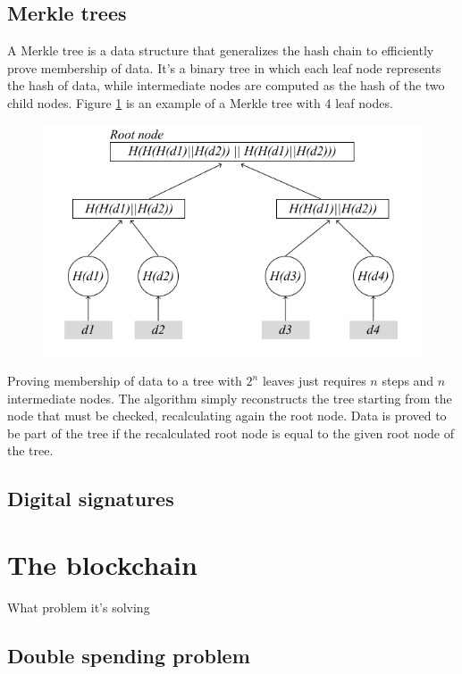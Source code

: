 \subsection{Merkle trees}

A Merkle tree is a data structure that generalizes the hash chain to efficiently prove membership of data. It's a binary tree in which each leaf node represents the hash of data, while intermediate nodes are computed as the hash of the two child nodes. Figure \ref{fig:merkle-tree} is an example of a Merkle tree with 4 leaf nodes.

\begin{figure}[H]
  \centering
  \includegraphics[width=1\textwidth]{Figures/background/merkle_tree.jpg}
  \caption[Merkle tree]{}
  \label{fig:merkle-tree}
\end{figure}

Proving membership of data to a tree with $2^n$ leaves just requires $n$ steps and $n$ intermediate nodes. The algorithm simply reconstructs the tree starting from the node that must be checked, recalculating again the root node. Data is proved to be part of the tree if the recalculated root node is equal to the given root node of the tree.

\subsection{Digital signatures}


\section{The blockchain}

What problem it's solving

\subsection{Double spending problem}

